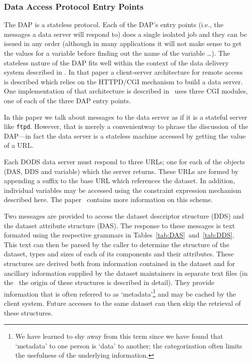 \subsubsection{Data Access Protocol Entry Points}
\label{entry}

The DAP is a stateless protocol. Each of the DAP's entry points (i.e.,
the messages a data server will respond to) does a single isolated job
and they can be issued in any order (although in many applications it
will not make sense to get the values for a variable before finding
out the name of the variable \ldots). The stateless nature of the DAP
fits well within the context of the data delivery system described in
\DDA\@.  In that paper a client-server architecture for remote access
is described which relies on the HTTPD/CGI mechanism to build a data
server. One implementation of that architecture is described in \DDD\
uses three CGI modules, one of each of the three DAP entry points.

In this paper we talk about messages to the data server as if it is a
stateful server like {\tt ftpd}. However, that is merely a convenientway to
phrase the discussion of the DAP---in fact the data server is a stateless
machine accessed by getting the value of a URL\@. 

Each DODS data server must respond to three URLs; one for each of the objects
(DAS, DDS and variable) which the server returns. These URLs are formed by
appending a suffix to the base URL which references the dataset. In
addition, individual variables may be accessed using the constraint
expression mechanism described here. The paper \URL\ contains more
information on this scheme.

Two messages are provided to access the dataset descriptor structure
(DDS) and the dataset attribute structure (DAS)\@. The response to
these messages is text formated using the respective grammars in
Tables~\ref{tab:DAS}~and~\ref{tab:DDS}. This text can then be parsed
by the caller to determine the structure of the dataset, types and
sizes of each of its components and their attributes. These structures
are derived both from information contained in the dataset and for
ancillary information supplied by the dataset maintainers in separate
text files (in the \ddd\ the origin of these structures is described
in detail). They provide information that is often referred to as
`metadata'\footnote{We have learned to shy away from this term since
we have found that `metadata' to one person is `data' to another; the
categorization often limits the usefulness of the underlying
information.} and may be cached by the client system.  Future accesses
to the same dataset can then skip the retrieval of these structures.

